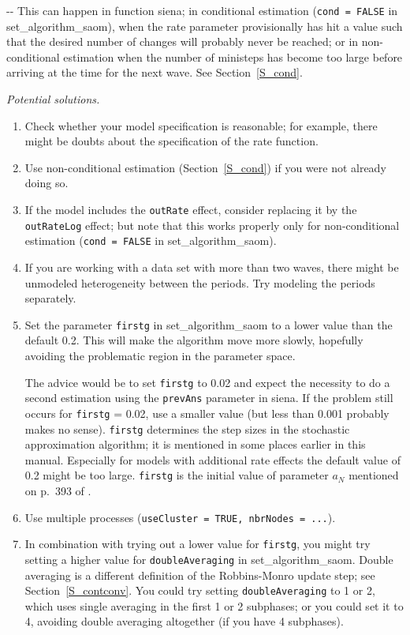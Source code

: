 \documentclass[a4paper,fleqn,11pt]{article}
\makeatletter
\newcommand{\+}{\, + \,}
\newcommand{\sfn}[1]{\textsf{#1}}
\newenvironment{indentation}[2]
{\par \setlength{\leftmargin}{#1}       \setlength{\rightmargin}{#2}
  \advance\linewidth -\leftmargin       \advance\linewidth -\rightmargin
  \advance\@totalleftmargin\leftmargin  \@setpar{{\@@par}}%
  \parshape 1 \@totalleftmargin         \linewidth \ignorespaces}{\par}
\makeatother
\begin{document}
\begin{indentation}{0.04\textwidth}{0pt}
\noindent
This can happen in function \textsf{siena};
in conditional estimation (\texttt{cond = FALSE} in\\
 \textsf{set\_algorithm\_saom}),
when the rate parameter provisionally has hit a value such that the
desired number of changes will probably never be reached;
or in non-conditional estimation when the number of ministeps has become
too large before arriving at the time for the next wave.
See Section~\ref{S_cond}.

\medskip

\noindent
\emph{Potential solutions.}
\begin{enumerate}
\item Check whether your model specification is reasonable;
    for example, there might be doubts about the specification of the
    rate function.
\item  Use non-conditional estimation (Section~\ref{S_cond}) if you were not
   already doing so.
\item If the model includes the \texttt{outRate} effect, consider
    replacing it by the \texttt{outRateLog} effect;
    but note that this works properly only for non-conditional estimation
    (\texttt{cond = FALSE} in \sfn{set\_algorithm\_saom}).
\item If you are working with a data set with more than two waves, there might
   be unmodeled heterogeneity between the periods. Try modeling the periods
   separately.
\item Set the parameter \texttt{firstg} in \textsf{set\_algorithm\_saom} to a
   lower value than the default 0.2.
   This will make the algorithm move more slowly, hopefully avoiding the problematic region
   in the parameter space.

   The advice would be to set  \texttt{firstg}  to 0.02
   and expect the necessity to do a second estimation using the \texttt{prevAns}
   parameter in \textsf{siena}. If the problem still occurs for \texttt{firstg} = 0.02,
   use a smaller value (but less than 0.001 probably makes no sense).
   \texttt{firstg} determines the step sizes in the stochastic approximation
   algorithm; it is mentioned in some places earlier in this manual.
   Especially for models with additional rate effects the default value of 0.2
   might be too large.
    \texttt{firstg}  is the initial value of parameter $a_N$ mentioned
    on p.\ 393 of \citet{Snijders01}.
\item Use multiple processes (\texttt{useCluster = TRUE, nbrNodes = ...}).
\item In combination with trying out a lower value for \texttt{firstg},
    you might try setting a higher value for  \texttt{doubleAveraging}
    in \textsf{set\_algorithm\_saom}. Double averaging is a different definition
    of the Robbins-Monro update step; see Section~\ref{S_contconv}.
    You could try setting  \texttt{doubleAveraging} to 1 or 2, which uses
    single averaging in the first 1 or 2 subphases; or you could set it to
    4, avoiding double averaging altogether (if you have 4 subphases).
\end{enumerate}
\end{indentation}
\end{document}
